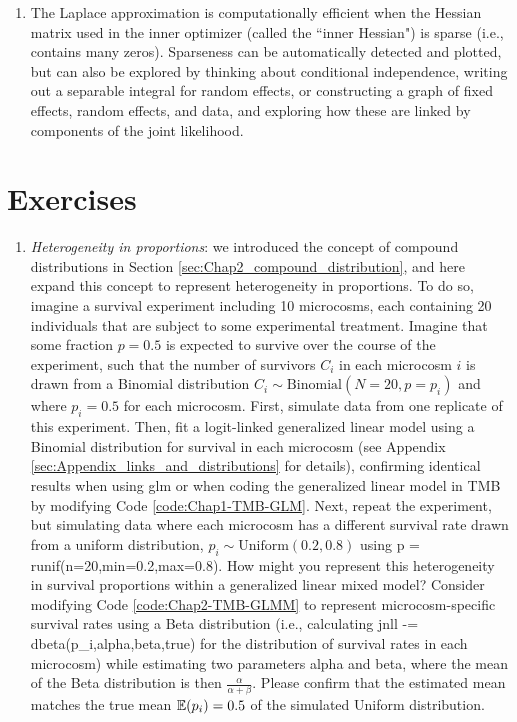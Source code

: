 \begin{enumerate}
    \item The Laplace approximation is computationally efficient when the Hessian matrix used in the inner optimizer (called the ``inner Hessian") is sparse (i.e., contains many zeros).  Sparseness can be automatically detected and plotted, but can also be explored by thinking about conditional independence, writing out a separable integral for random effects, or constructing a graph of fixed effects, random effects, and data, and exploring how these are linked by components of the joint likelihood.
\end{enumerate}

\section{Exercises}


\begin{enumerate}
    \item \textit{Heterogeneity in proportions}:  we introduced the concept of compound distributions in Section \ref{sec:Chap2_compound_distribution}, and here expand this concept to represent heterogeneity in proportions.  To do so, imagine a survival experiment including 10 microcosms, each containing 20 individuals that are subject to some experimental treatment.  Imagine that some fraction \(p=0.5\) is expected to survive over the course of the experiment, such that the number of survivors \( C_i\) in each microcosm \(i\) is drawn from a Binomial distribution \( C_i \sim \mathrm{Binomial}(N=20,p=p_i)\) and where \(p_i = 0.5\) for each microcosm.  First, simulate data from one replicate of this experiment.  Then, fit a logit-linked generalized linear model using a Binomial distribution for survival in each microcosm (see Appendix \ref{sec:Appendix_links_and_distributions} for details), confirming identical results when using \colorbox{backcolour}{glm} or when coding the generalized linear model in TMB by modifying Code \ref{code:Chap1-TMB-GLM}.  Next, repeat the experiment, but simulating data where each microcosm has a different survival rate drawn from a uniform distribution, \( p_i \sim \mathrm{Uniform}(0.2,0.8) \) using \colorbox{backcolour}{p = runif(n=20,min=0.2,max=0.8)}.  How might you represent this heterogeneity in survival proportions within a generalized linear mixed model?  Consider modifying Code \ref{code:Chap2-TMB-GLMM} to represent microcosm-specific survival rates using a Beta distribution (i.e., calculating \colorbox{backblue}{jnll -= dbeta(p\_i,alpha,beta,true)} for the distribution of survival rates in each microcosm) while estimating two parameters \colorbox{backblue}{alpha} and \colorbox{backblue}{beta}, where the mean of the Beta distribution is then \(\frac{\alpha}{\alpha+\beta}\).  Please confirm that the estimated mean matches the true mean \( \operatorname{\mathbb{E}}(p_i) = 0.5\) of the simulated Uniform distribution. 


\end{enumerate}
